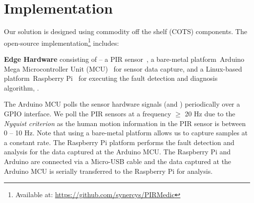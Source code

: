 \section{Implementation}
\label{sec:impl}

Our solution is designed using commodity off the shelf (COTS) components.
%
The open-source implementation\footnote{Available at: \url{https://github.com/synercys/PIRMedic}} includes:


\ca \textbf{Edge Hardware} consisting of -- \ci a PIR sensor~\cite{PIR_sensor_eval}, \cii a bare-metal platform~\viz Arduino Mega Microcontroller Unit (MCU)~\cite{arduino_mega} 
for sensor data capture, and \ciii a Linux-based platform~\viz Raspberry Pi~\cite{rpi3} 
for executing the fault detection and diagnosis algorithm, \sol.%


The Arduino MCU polls the sensor hardware signals (\ie \cout and \aout) periodically over a GPIO interface. We poll the PIR sensors at a frequency $\geq$ 20 Hz due to the \textit{Nyquist criterion} as the human motion information in the PIR sensor is between 0 -- 10 Hz. %
Note that using a bare-metal platform allows us to capture \aout samples at a constant rate. %
The Raspberry Pi platform performs the fault detection and analysis for the data captured at the Arduino MCU.
The Raspberry Pi and Arduino are connected via a Micro-USB cable and the data captured at the Arduino MCU is serially transferred to the Raspberry Pi for analysis. 

